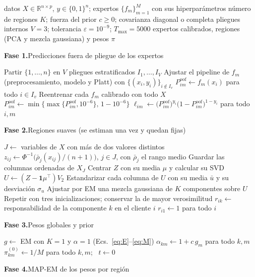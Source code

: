\documentclass[11pt,a4paper]{article}
\newcommand{\AlgFase}[2]{\Statex\vspace{-1pt}\colorbox{algfondo}{\parbox{\dimexpr\linewidth-2\fboxsep\relax}{\color{algazul}\rule{0pt}{2.3ex}\textbf{Fase #1.}\enspace #2}}}
\begin{document}
\begin{algorithm}[t]
\caption{Ajuste de RegionalMAPEM}
\label{alg:mapem}
\footnotesize\linespread{1.08}\selectfont
\begin{algorithmic}[1]
\Require datos $X\in\mathbb R^{n\times p}$, $y\in\{0,1\}^n$; expertos $\{f_m\}_{m=1}^M$ con sus hiperparámetros
\Hiper número de regiones $K$; fuerza del prior $c\ge0$; covarianza diagonal o completa
\Const pliegues internos $V=3$; tolerancia $\varepsilon=10^{-9}$; $T_{\max}=5000$
\Ensure expertos calibrados, regiones (PCA y mezcla gaussiana) y pesos $\pi$
\AlgFase{1}{Predicciones fuera de pliegue de los expertos}
\State Partir $\{1,\dots,n\}$ en $V$ pliegues estratificados $I_1,\dots,I_V$
 
    \State Ajustar el pipeline de $f_m$ (preprocesamiento, modelo y Platt) con $\{(x_i,y_i)\}_{i\notin I_v}$
    \State $P^{\mathrm{oof}}_{im}\gets f_m(x_i)$ para todo $i\in I_v$
  \EndFor
\EndFor
\State Reentrenar cada $f_m$ calibrado con todo $X$ 
\State $P^{\mathrm{oof}}_{im}\gets\min\{\max\{P^{\mathrm{oof}}_{im},10^{-6}\},\,1-10^{-6}\}$ 
\State $\ell_{im}\gets\big(P^{\mathrm{oof}}_{im}\big)^{y_i}\big(1-P^{\mathrm{oof}}_{im}\big)^{1-y_i}$ para todo $i,m$
\AlgFase{2}{Regiones suaves (se estiman una vez y quedan fijas)}
\State $J\gets$ variables de $X$ con más de dos valores distintos
\State $z_{ij}\gets\Phi^{-1}\big(\bar\rho_j(x_{ij})/(n+1)\big)$, $j\in J$, con $\bar\rho_j$ el rango medio 
\State Guardar las columnas ordenadas de $X_J$ 
\State Centrar $Z$ con su media $\mu$ y calcular su SVD
\State $U\gets(Z-\mathbf 1\mu^\top)V_2$ 
\State Estandarizar cada columna de $U$ con su media $\bar u$ y su desviación $\sigma_u$
  \State Ajustar por EM una mezcla gaussiana de $K$ componentes sobre $U$ 
  \State Repetir con tres inicializaciones; conservar la de mayor verosimilitud 
  \State $r_{ik}\gets$ responsabilidad de la componente $k$ en el cliente $i$ 
\Else
  \State $r_{i1}\gets1$ para todo $i$
\EndIf
\AlgFase{3}{Pesos globales y prior}
\State $g\gets$ EM con $K=1$ y $\alpha=1$ (Ecs.~\ref{eq:E}--\ref{eq:M}) 
\State $\alpha_{km}\gets1+c\,g_m$ para todo $k,m$ 
\State $\pi^{(0)}_{km}\gets1/M$ para todo $k,m$; \ $t\gets0$ 
\AlgFase{4}{MAP-EM de los pesos por región}
\Repeat

\end{algorithmic}
\end{algorithm}
\end{document}
